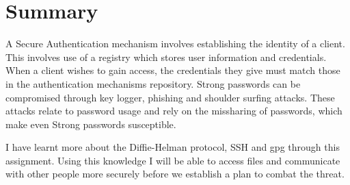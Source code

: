 \documentclass{article}
\begin{document}
\section{Summary}
A Secure Authentication mechanism involves establishing the identity of a client. This involves use of a registry which stores user information and credentials. When a client wishes to gain access, the credentials they give must match those in the authentication mechanisms repository.
Strong passwords can be compromised through key logger, phishing and shoulder surfing attacks. These attacks relate to password usage and rely on the missharing of passwords, which make even Strong passwords susceptible.

I have learnt more about the Diffie-Helman protocol, SSH and gpg through this assignment. Using this knowledge I will be able to access files and communicate with other people more securely before we establish a plan to combat the threat. 
\end{document}
